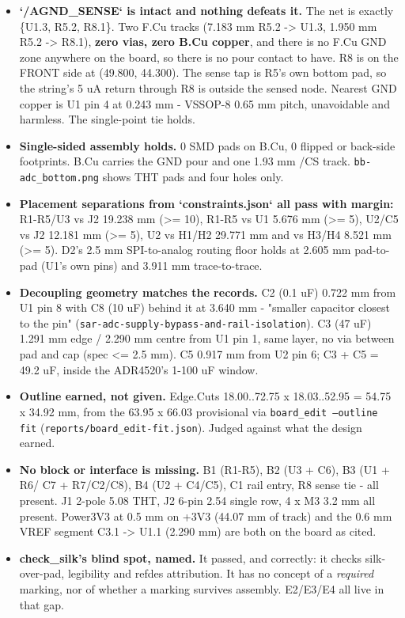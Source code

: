 \documentclass[11pt,a4paper]{article}
\begin{document}
\begin{itemize}
\item \textbf{`/AGND\_SENSE` is intact and nothing defeats it.} The net is exactly
\{U1.3, R5.2, R8.1\}. Two F.Cu tracks (7.183 mm R5.2 -\textgreater{} U1.3, 1.950 mm
R5.2 -\textgreater{} R8.1), \textbf{zero vias, zero B.Cu copper}, and there is no F.Cu GND zone
anywhere on the board, so there is no pour contact to have. R8 is on the
FRONT side at (49.800, 44.300). The sense tap is R5's own bottom pad, so the
string's 5 uA return through R8 is outside the sensed node. Nearest GND
copper is U1 pin 4 at 0.243 mm - VSSOP-8 0.65 mm pitch, unavoidable and
harmless. The single-point tie holds.
\item \textbf{Single-sided assembly holds.} 0 SMD pads on B.Cu, 0 flipped or back-side
footprints. B.Cu carries the GND pour and one 1.93 mm /CS track.
\texttt{bb-adc\_bottom.png} shows THT pads and four holes only.
\item \textbf{Placement separations from `constraints.json` all pass with margin:}
R1-R5/U3 vs J2 19.238 mm (\textgreater{}= 10), R1-R5 vs U1 5.676 mm (\textgreater{}= 5), U2/C5 vs J2
12.181 mm (\textgreater{}= 5), U2 vs H1/H2 29.771 mm and vs H3/H4 8.521 mm (\textgreater{}= 5).
D2's 2.5 mm SPI-to-analog routing floor holds at 2.605 mm pad-to-pad (U1's
own pins) and 3.911 mm trace-to-trace.
\item \textbf{Decoupling geometry matches the records.} C2 (0.1 uF) 0.722 mm from U1
pin 8 with C8 (10 uF) behind it at 3.640 mm - "smaller capacitor closest to
the pin" (\texttt{sar-adc-supply-bypass-and-rail-isolation}). C3 (47 uF) 1.291 mm
edge / 2.290 mm centre from U1 pin 1, same layer, no via between pad and cap
(spec \textless{}= 2.5 mm). C5 0.917 mm from U2 pin 6; C3 + C5 = 49.2 uF, inside the
ADR4520's 1-100 uF window.
\item \textbf{Outline earned, not given.} Edge.Cuts 18.00..72.75 x 18.03..52.95 =
54.75 x 34.92 mm, from the 63.95 x 66.03 provisional via
\texttt{board\_edit --outline fit} (\texttt{reports/board\_edit-fit.json}). Judged against
what the design earned.
\item \textbf{No block or interface is missing.} B1 (R1-R5), B2 (U3 + C6), B3 (U1 + R6/
C7 + R7/C2/C8), B4 (U2 + C4/C5), C1 rail entry, R8 sense tie - all present.
J1 2-pole 5.08 THT, J2 6-pin 2.54 single row, 4 x M3 3.2 mm all present.
Power3V3 at 0.5 mm on +3V3 (44.07 mm of track) and the 0.6 mm VREF segment
C3.1 -\textgreater{} U1.1 (2.290 mm) are both on the board as cited.
\item \textbf{check\_silk's blind spot, named.} It passed, and correctly: it checks
silk-over-pad, legibility and refdes attribution. It has no concept of a
\emph{required} marking, nor of whether a marking survives assembly. E2/E3/E4 all
live in that gap.
\end{itemize}
\end{document}
